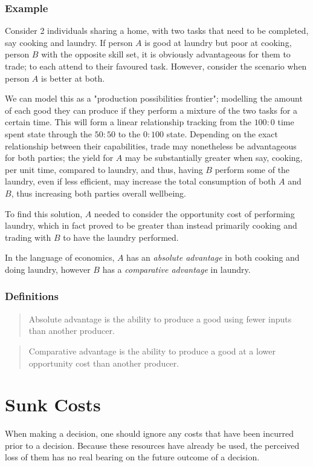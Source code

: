 \documentclass[12pt]{report}
\begin{document}
\subsubsection*{Example}
Consider 2 individuals sharing a home, with two tasks that need to be completed, say 
cooking and laundry. If person \(A\) is good at laundry but poor at cooking, person \(B\)
with the opposite skill set, it is obviously advantageous for them to trade; to each
attend to their favoured task. However, consider the scenario when person \(A\) is better
at both.
\par
We can model this as a "production possibilities frontier"; modelling the amount of each
good they can produce if they perform a mixture of the two tasks for a certain time. This will
form a linear relationship tracking from the \(100:0\) time spent state through the \(50:50\) to the \(0:100\) state. Depending on the 
exact relationship between their capabilities, trade may nonetheless be advantageous for both 
parties; the yield for \(A\) may be substantially greater when say, cooking, per unit time,
compared to laundry, and thus, having \(B\) perform some of the laundry, even if less efficient,
may increase the total consumption of both \(A\) and \(B\), thus increasing both parties overall
wellbeing. 
\par
To find this solution, \(A\) needed to consider the opportunity cost of performing laundry,
which in fact proved to be greater than instead primarily cooking and trading with \(B\) to have the laundry
performed.
\par
In the language of economics, \(A\) has an \textit{absolute advantage} in both cooking and doing laundry,
however \(B\) has a \textit{comparative advantage} in laundry.

\subsubsection*{Definitions}
\begin{quotation}    
Absolute advantage is the ability to produce a good using fewer inputs than another producer.
\end{quotation}
\begin{quotation}
Comparative advantage is the ability to produce a good at a lower opportunity cost than another producer.    
\end{quotation}

\section*{Sunk Costs}
When making a decision, one should ignore any costs that have been incurred prior to a decision.
Because these resources have already be used, the perceived loss of them has no real bearing on 
the future outcome of a decision.
\end{document}
